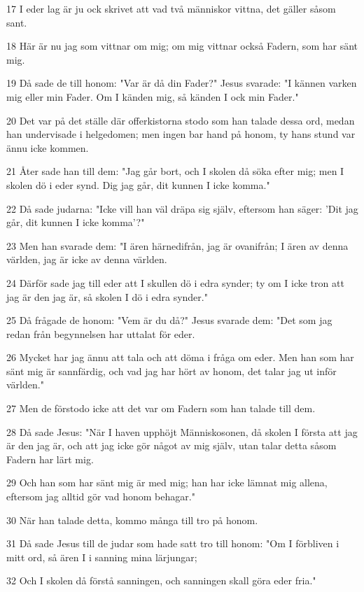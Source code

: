 \par 17 I eder lag är ju ock skrivet att vad två människor vittna, det gäller såsom sant.
\par 18 Här är nu jag som vittnar om mig; om mig vittnar också Fadern, som har sänt mig.
\par 19 Då sade de till honom: "Var är då din Fader?" Jesus svarade: "I kännen varken mig eller min Fader. Om I känden mig, så känden I ock min Fader."
\par 20 Det var på det ställe där offerkistorna stodo som han talade dessa ord, medan han undervisade i helgedomen; men ingen bar hand på honom, ty hans stund var ännu icke kommen.
\par 21 Åter sade han till dem: "Jag går bort, och I skolen då söka efter mig; men I skolen dö i eder synd. Dig jag går, dit kunnen I icke komma."
\par 22 Då sade judarna: "Icke vill han väl dräpa sig själv, eftersom han säger: 'Dit jag går, dit kunnen I icke komma'?"
\par 23 Men han svarade dem: "I ären härnedifrån, jag är ovanifrån; I ären av denna världen, jag är icke av denna världen.
\par 24 Därför sade jag till eder att I skullen dö i edra synder; ty om I icke tron att jag är den jag är, så skolen I dö i edra synder."
\par 25 Då frågade de honom: "Vem är du då?" Jesus svarade dem: "Det som jag redan från begynnelsen har uttalat för eder.
\par 26 Mycket har jag ännu att tala och att döma i fråga om eder. Men han som har sänt mig är sannfärdig, och vad jag har hört av honom, det talar jag ut inför världen."
\par 27 Men de förstodo icke att det var om Fadern som han talade till dem.
\par 28 Då sade Jesus: "När I haven upphöjt Människosonen, då skolen I första att jag är den jag är, och att jag icke gör något av mig själv, utan talar detta såsom Fadern har lärt mig.
\par 29 Och han som har sänt mig är med mig; han har icke lämnat mig allena, eftersom jag alltid gör vad honom behagar."
\par 30 När han talade detta, kommo många till tro på honom.
\par 31 Då sade Jesus till de judar som hade satt tro till honom: "Om I förbliven i mitt ord, så ären I i sanning mina lärjungar;
\par 32 Och I skolen då förstå sanningen, och sanningen skall göra eder fria."
